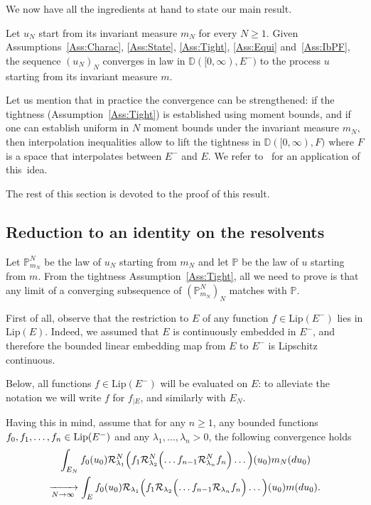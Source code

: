 \documentclass[AHL,Unicode,longabstracts]{cedram}
\theoremstyle{plain}
\newcommand{\bbD}{\mathbb{D}}
\newcommand{\bbP}{\mathbb{P}}
\newcommand{\cR}{\mathcal{R}}
\newcommand*\Lip{\mathrm{Lip}}
\renewcommand*{\to}{\mathchoice{\longrightarrow}{\rightarrow}{\rightarrow}{\rightarrow}}
\begin{document}
We now have all the ingredients at hand to state our main result.

\begin{theo}\label{Th:BlackBox}
Let $u_N$ start from its invariant measure $m_N$ for every $N\ge 1$. Given Assumptions~\ref{Ass:Charac}, \ref{Ass:State}, \ref{Ass:Tight}, \ref{Ass:Equi} and~\ref{Ass:IbPF}, the sequence $(u_N)_N$ converges in law in $\bbD([0,\infty), E^{-})$ to the process $u$ starting from its invariant measure $m$.
\end{theo}

Let us mention that in practice the convergence can be strengthened: if the tightness (Assumption~\ref{Ass:Tight}) is established using moment bounds, and if one can establish uniform in $N$ moment bounds under the invariant measure $m_N$, then interpolation inequalities allow to lift the tightness in $\bbD([0,\infty), F)$ where $F$ is a space that interpolates between $E^-$ and $E$. We refer to~\cite[Lemma~5.2]{DebZam} for an application of this~idea.


The rest of this section is devoted to the proof of this result.

\subsection{Reduction to an identity on the resolvents}\label{Subsec:Reduction}

Let $\bbP_{m_N}^{N}$ be the law of $u_N$ starting from $m_N$ and let $\bbP$ be the law of $u$ starting from $m$. From the tightness Assumption~\ref{Ass:Tight}, all we need to prove is that any limit of a converging subsequence of $(\bbP_{m_N}^{N})_N$ matches with $\bbP$.

First of all, observe that the restriction to $E$ of any function $f \in \Lip(E^-)$ lies in $\Lip(E)$. Indeed, we assumed that $E$ is continuously embedded in $E^-$, and therefore the bounded linear embedding map from $E$ to $E^-$ is Lipschitz continuous.

Below, all functions $f\in \Lip(E^-)$ will be evaluated on $E$: to alleviate the notation we will write $f$ for $f_{\mid E}$, and similarly with $E_N$.

Having this in mind, assume that for any $n\geq 1$, any bounded functions $f_0,f_1,\dots,\linebreak f_n\in\Lip(E^-)$ and any $\lambda_1,\dots,\lambda_n >0$, the following convergence holds
\begin{multline}\label{Eq:RecurResolv}
{}\int_{E_N} f_0(u_0)\cR^N_{\lambda_1} \Bigl(f_1\cR^N_{\lambda_2} \Bigl(\dots f_{n-1} \cR^N_{\lambda_n} f_n\Bigr)\dots\Bigr) (u_0) m_N(du_0)\\
\xrightarrow[N\to\infty]{}
\int_{E} f_0(u_0)\cR_{\lambda_1} \Bigl(f_1\cR_{\lambda_2} \Bigl(\dots f_{n-1} \cR_{\lambda_n} f_n\Bigr)\dots\Bigr) (u_0) m(du_0).
\end{multline}
\end{document}
